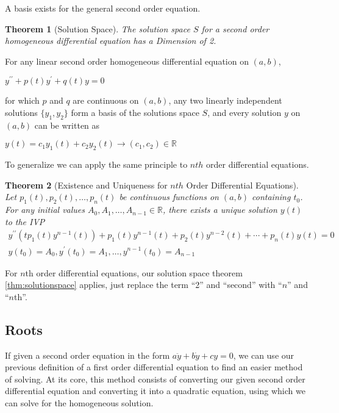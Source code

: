 \documentclass[12pt,landscape,twocolumn]{article}
\newtheorem{thm}{Theorem}
\begin{document}
    A basis exists for the general second order equation.

        \begin{thm}[Solution Space]\label{thm:solutionspace}
            The solution space $S$ for a second order homogeneous differential equation has a Dimension of 2.
        \end{thm}

    For any linear second order homogeneous differential equation on $(a, b)$,

        $
            y^{\prime\prime} + p(t) y^\prime + q(t)y = 0
        $

    for which $p$ and $q$ are continuous on $(a, b)$, any two linearly independent solutions $\{y_1, y_2\}$ form a basis of the solutions space $S$, and every solution $y$ on $(a, b)$ can be written as

        $
            y(t) = c_1 y_1(t) + c_2 y_2(t) \to (c_1, c_2) \in \mathbb{R}
        $

    To generalize we can apply the same principle to $nth$ order differential equations.

        \begin{thm}[Existence and Uniqueness for $nth$ Order Differential Equations]\label{thm:neau}
        Let $p_1(t), p_2(t), \dots, p_n(t)$ be continuous functions on $(a, b)$ containing $t_0$. For any initial values $A_0, A_1, \dots, A_{n-1} \in \mathbb{R}$, there exists a unique solution $y(t)$ to the IVP
        $
        \begin{aligned}
            y^{\prime\prime}(tp_1(t)y^{n - 1}(t)) + p_1(t)y^{n - 1}(t) + p_2(t)y^{n - 2}(t) + \cdots + p_n(t)y(t) = 0\\
            y(t_0) = A_0, y^\prime(t_0) = A_1, \dots, y^{n - 1}(t_0) = A_{n-1}
        \end{aligned}
        $
    \end{thm}

    For $n$th order differential equations, our solution space theorem \eqref{thm:solutionspace} applies, just replace the term ``2'' and ``second'' with ``$n$'' and ``$n$th''.

    \subsection{Roots}\label{sec:2deroots}
    If given a second order equation in the form $a \ddot{y} + b \dot{y} + cy = 0$, we can use our previous definition of a first order differential equation to find an easier method of solving. At its core, this method consists of converting our given second order differential equation and converting it into a quadratic equation, using which we can solve for the homogeneous solution.
\end{document}
